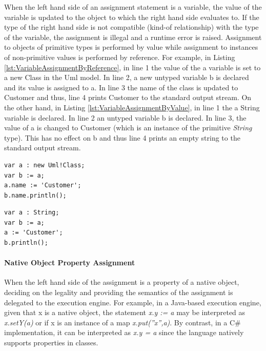 When the left hand side of an assignment statement is a variable, the value of the variable is updated to the object to which the right hand side evaluates to. If the type of the right hand side is not compatible (kind-of relationship) with the type of the variable, the assignment is illegal and a runtime error is raised. Assignment to objects of primitive types is performed by value while assignment to instances of non-primitive values is performed by reference. For example, in Listing \ref{lst:VariableAssignmentByReference}, in line 1 the value
of the a variable is set to a new Class in the Uml model. In line 2, a new untyped variable b is declared and its value is assigned to a. In line 3 the name of the class is updated to Customer and thus, line 4 prints Customer to the standard output stream. On the other hand, in Listing \ref{lst:VariableAssignmentByValue}, in line 1 the a String variable is declared. In line 2 an untyped variable b is declared. In line 3, the value of a is changed to Customer (which is an instance of the primitive \emph{String} type). This has no effect on b and thus line 4 prints an empty string to the standard output stream.

\begin{lstlisting}[basicstyle=\ttfamily\footnotesize, flexiblecolumns=true, numbers=none, nolol=true, caption=Assigning the value of a variable by reference, label=lst:VariableAssignmentByReference, numbers=left, language=EOL, tabsize=2]
var a : new Uml!Class;
var b := a;
a.name := 'Customer';
b.name.println();
\end{lstlisting}

\begin{lstlisting}[basicstyle=\ttfamily\footnotesize, flexiblecolumns=true, numbers=none, nolol=true, caption=Assigning the value of a variable by value, label=lst:VariableAssignmentByValue, numbers=left, language=EOL, tabsize=2]
var a : String;
var b := a;
a := 'Customer';
b.println();
\end{lstlisting}

\paragraph{Native Object Property Assignment}

When the left hand side of the assignment is a property of a native object, deciding on the legality and providing the semantics of the assignment is delegated to the execution engine. For example, in a Java-based execution engine, given that x is a native object, the statement \emph{x.y := a} may be interpreted as \emph{x.setY(a)} or if x is an instance of a map \emph{x.put(''x'',a)}. By contrast, in a C\# implementation, it can be interpreted as \emph{x.y = a} since
the language natively supports properties in classes.


